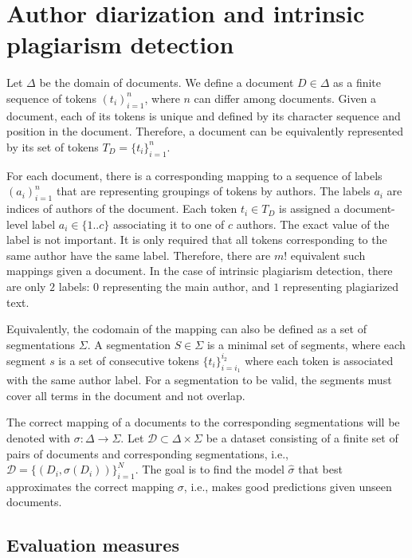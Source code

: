 \documentclass[10pt, a4paper]{article}
\begin{document}
\section{Author diarization and intrinsic plagiarism detection} \label{sec:author-diraization}

Let $\Delta$ be the domain of documents. We define a document $D\in \Delta$ as a finite sequence of tokens $(t_i)_{i=1}^n$, where $n$ can differ among documents. Given a document, each of its tokens is unique and defined by its character sequence and position in the document. Therefore, a document can be equivalently represented by its set of tokens $T_D=\{t_i\}_{i=1}^n$.

For each document, there is a corresponding mapping to a sequence of labels $(a_i)_{i=1}^n$ that are representing groupings of tokens by authors. The labels $a_i$ are indices of authors of the document. Each token $t_i\in T_D$ is assigned a document-level label $a_i \in \{1..c\}$ associating it to one of $c$ authors. The exact value of the label is not important. It is only required that all tokens corresponding to the same author have the same label. Therefore, there are $m!$ equivalent such mappings given a document. In the case of intrinsic plagiarism detection, there are only $2$ labels: $0$ representing the main author, and $1$ representing plagiarized text.

Equivalently, the codomain of the mapping can also be defined as a set of segmentations $\Sigma$. A segmentation $S\in \Sigma$ is a minimal set of segments, where each segment $s$ is a set of consecutive tokens $\{t_i\}_{i=i_1}^{i_2}$ where each token is associated with the same author label. For a segmentation to be valid, the segments must cover all terms in the document and not overlap.

The correct mapping of a documents to the corresponding segmentations will be denoted with $\sigma: \Delta\rightarrow\Sigma$. Let $\mathcal{D} \subset \Delta\times\Sigma$ be a dataset consisting of a finite set of pairs of documents and corresponding segmentations, i.e., $\mathcal{D} = \{\left(D_i, \sigma(D_i)\right)\}_{i=1}^N$. The goal is to find the model $\hat{\sigma}$ that best approximates the correct mapping $\sigma$, i.e., makes good predictions given unseen documents.

\subsection{Evaluation measures} \label{subsec:evaluation-measures}
\end{document}
